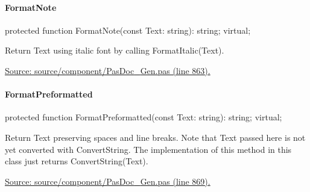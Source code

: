 \documentclass{report}
\newif\ifpdf
\begin{document}
\paragraph*{FormatNote}\hspace*{\fill}

\label{PasDoc_Gen.TDocGenerator-FormatNote}
\begin{list}{}{
\setlength{\itemindent}{0cm}
\setlength{\listparindent}{0cm}
\setlength{\leftmargin}{\evensidemargin}
\addtolength{\leftmargin}{\tmplength}
\settowidth{\labelsep}{X}
\addtolength{\leftmargin}{\labelsep}
\setlength{\labelwidth}{\tmplength}
}
\item[\textbf{Declaration}\hfill]
\ifpdf
\begin{flushleft}
\fi
\begin{ttfamily}
protected function FormatNote(const Text: string): string; virtual;\end{ttfamily}

\ifpdf
\end{flushleft}
\fi

\par
\item[\textbf{Description}]
Return Text using italic font by calling FormatItalic(Text).\par
\href{https://github.com/pasdoc/pasdoc/blob/master/source/component/PasDoc_Gen.pas#L863}{Source: source/component/PasDoc{\_}Gen.pas (line 863).}

\end{list}
\paragraph*{FormatPreformatted}\hspace*{\fill}

\label{PasDoc_Gen.TDocGenerator-FormatPreformatted}
\begin{list}{}{
\setlength{\itemindent}{0cm}
\setlength{\listparindent}{0cm}
\setlength{\leftmargin}{\evensidemargin}
\addtolength{\leftmargin}{\tmplength}
\settowidth{\labelsep}{X}
\addtolength{\leftmargin}{\labelsep}
\setlength{\labelwidth}{\tmplength}
}
\item[\textbf{Declaration}\hfill]
\ifpdf
\begin{flushleft}
\fi
\begin{ttfamily}
protected function FormatPreformatted(const Text: string): string; virtual;\end{ttfamily}

\ifpdf
\end{flushleft}
\fi

\par
\item[\textbf{Description}]
Return Text preserving spaces and line breaks. Note that Text passed here is not yet converted with ConvertString. The implementation of this method in this class just returns ConvertString(Text).\par
\href{https://github.com/pasdoc/pasdoc/blob/master/source/component/PasDoc_Gen.pas#L869}{Source: source/component/PasDoc{\_}Gen.pas (line 869).}

\end{list}
\end{document}
